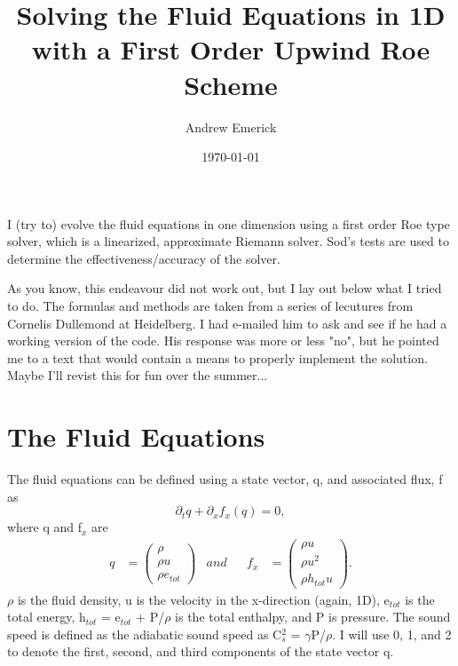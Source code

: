 \documentclass{article}
\begin{document}
\title{Solving the Fluid Equations in 1D with a First Order Upwind Roe Scheme}
\author{Andrew Emerick}

\date\today
\maketitle

I (try to) evolve the fluid equations in one dimension using a first order Roe type
solver, which is a linearized, approximate Riemann solver.
Sod's tests are used to determine the effectiveness/accuracy of the solver.

As you know, this endeavour did not work out, but I lay out below what I 
tried to do. The formulas and methods are taken from a series of lecutures
from Cornelis Dullemond at Heidelberg. I had e-mailed him to ask and see if he
had a working version of the code. His response was more or less "no", but he
pointed me to a text that would contain a means to properly implement the
solution. Maybe I'll revist this for fun over the summer...

\section{The Fluid Equations}
The fluid equations can be defined using a state vector, q, and associated flux, f as
\begin{equation}
\label{eq:fluid equations}
\partial_{t} q + \partial_{x} f_{x}(q) = 0,
\end{equation} 
where q and f$_{x}$ are
\begin{align}
q &= 
\begin{pmatrix}
\rho \\ 
\rho u \\
\rho e_{tot} 
\end{pmatrix}
& and & & f_{x} &= 
\begin{pmatrix}
\rho u \\
\rho u^{2} \\
\rho h_{tot} u
\end{pmatrix}.
\end{align}
$\rho$ is the fluid density, u is the velocity in the x-direction (again, 1D),
e$_{tot}$ is the total energy, h$_{tot}$ = e$_{tot}$ + P/$\rho$ is the total enthalpy,
and P is pressure. The sound speed is defined as the adiabatic sound speed as 
C$^{2}_{s}$ = $\gamma$P/$\rho$. I will use 0, 1, and 2 to denote the first, second, and
third components of the state vector q.
\end{document}

